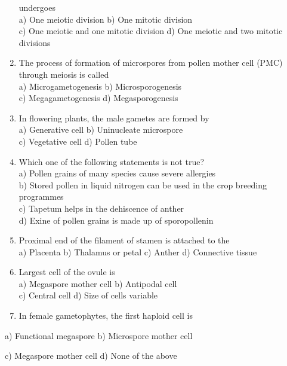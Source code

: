 \begin{enumerate}
  undergoes\\
  a) One meiotic division b) One mitotic division\\
  c) One meiotic and one mitotic division d) One meiotic and two mitotic
  divisions
\item
  The process of formation of microspores from pollen mother cell (PMC)
  through meiosis is called\\
  a) Microgametogenesis b) Microsporogenesis\\
  c) Megagametogenesis d) Megasporogenesis
\item
  In flowering plants, the male gametes are formed by\\
  a) Generative cell b) Uninucleate microspore\\
  c) Vegetative cell d) Pollen tube
\item
  Which one of the following statements is not true?\\
  a) Pollen grains of many species cause severe allergies\\
  b) Stored pollen in liquid nitrogen can be used in the crop breeding
  programmes\\
  c) Tapetum helps in the dehiscence of anther\\
  d) Exine of pollen grains is made up of sporopollenin
\item
  Proximal end of the filament of stamen is attached to the\\
  a) Placenta b) Thalamus or petal c) Anther d) Connective tissue
\item
  Largest cell of the ovule is\\
  a) Megaspore mother cell b) Antipodal cell\\
  c) Central cell d) Size of cells variable
\item
  In female gametophytes, the first haploid cell is
\end{enumerate}

a) Functional megaspore b) Microspore mother cell

c) Megaspore mother cell d) None of the above

